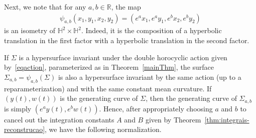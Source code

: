 \documentclass[11pt,a4paper]{amsart}
\renewcommand{\S}{\Sigma}
\theoremstyle{plain}
\theoremstyle{remark}
\newcommand{\R}{\mathbb{R}}
\newcommand{\Hyp}{\mathbb{H}}
\begin{document}
Next, we note that for any $a,b\in \R$, the map 
\begin{align*}
\psi_{a,b}(x_1,y_1,x_2,y_2) = (e^ax_1,e^ay_1,e^bx_2,e^by_2)
\end{align*}
is an isometry of $\Hyp^2\times \Hyp^2$. Indeed, it is the composition
of a hyperbolic translation in the first factor with a hyperbolic translation
in the second factor. 

If $\S$ is a hypersurface invariant under the double horocyclic
action given by~\eqref{eqaction}, parameterized as in Theorem~\ref{mainThm},
the surface $\S_{a,b} = \psi_{a,b}(\S)$ is also a hypersurface invariant
by the same action (up to a reparameterization) 
and with the same constant mean curvature. If $(y(t),w(t))$
is the generating curve of $\S$, then the generating
curve of $\S_{a,b}$ is simply $(e^ay(t),e^bw(t))$.
Hence, after appropriately choosing $a$ and $b$ to cancel out the 
integration constants $A$ and $B$ given by
Theorem~\ref{thm:integrais-reconstrucao},
we have the following normalization.
\end{document}
